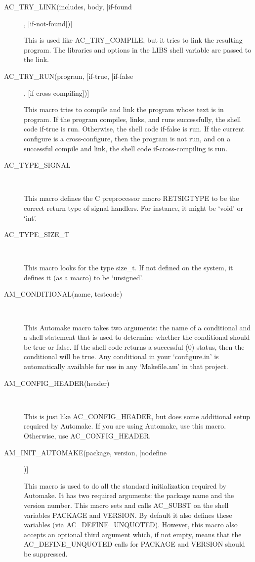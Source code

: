 \begin{description}
\item[AC\_{}TRY\_{}LINK(includes, body, [if-found], [if-not-found])]
\

    This is used like AC\_{}TRY\_{}COMPILE, but it tries to link the resulting program. The libraries and options in the LIBS shell variable are passed to the link.

\item[AC\_{}TRY\_{}RUN(program, [if-true, [if-false], [if-cross-compiling])]
\

    This macro tries to compile and link the program whose text is in program. If the program compiles, links, and runs successfully, the shell code if-true is run. Otherwise, the shell code if-false is run. If the current configure is a cross-configure, then the program is not run, and on a successful compile and link, the shell code if-cross-compiling is run.

\item[AC\_{}TYPE\_{}SIGNAL]
\

    This macro defines the C preprocessor macro RETSIGTYPE to be the correct return type of signal handlers. For instance, it might be `void' or `int'.

\item[AC\_{}TYPE\_{}SIZE\_{}T]
\

    This macro looks for the type size\_{}t. If not defined on the system, it defines it (as a macro) to be `unsigned'.

\item[AM\_{}CONDITIONAL(name, testcode)]
\

    This Automake macro takes two arguments: the name of a conditional and a shell statement that is used to determine whether the conditional should be true or false. If the shell code returns a successful (0) status, then the conditional will be true. Any conditional in your `configure.in' is automatically available for use in any `Makefile.am' in that project.

\item[AM\_{}CONFIG\_{}HEADER(header)]
\

    This is just like AC\_{}CONFIG\_{}HEADER, but does some additional setup required by Automake. If you are using Automake, use this macro. Otherwise, use AC\_{}CONFIG\_{}HEADER.

\item[AM\_{}INIT\_{}AUTOMAKE(package, version, [nodefine])]
\

    This macro is used to do all the standard initialization required by Automake. It has two required arguments: the package name and the version number. This macro sets and calls AC\_{}SUBST on the shell variables PACKAGE and VERSION. By default it also defines these variables (via AC\_{}DEFINE\_{}UNQUOTED). However, this macro also accepts an optional third argument which, if not empty, means that the AC\_{}DEFINE\_{}UNQUOTED calls for PACKAGE and VERSION should be suppressed.


\end{description}
